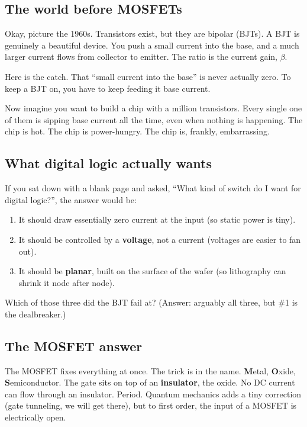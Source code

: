 \documentclass[11pt]{article}
\begin{document}
\subsection{The world before MOSFETs}

Okay, picture the 1960s. Transistors exist, but they are bipolar (BJTs). A BJT is genuinely a beautiful device. You push a small current into the base, and a much larger current flows from collector to emitter. The ratio is the current gain, $\beta$.

Here is the catch. That ``small current into the base'' is never actually zero. To keep a BJT on, you have to keep feeding it base current.

Now imagine you want to build a chip with a million transistors. Every single one of them is sipping base current all the time, even when nothing is happening. The chip is hot. The chip is power-hungry. The chip is, frankly, embarrassing.

\subsection{What digital logic actually wants}

If you sat down with a blank page and asked, ``What kind of switch do I want for digital logic?'', the answer would be:

\begin{enumerate}
\item It should draw essentially zero current at the input (so static power is tiny).
\item It should be controlled by a \textbf{voltage}, not a current (voltages are easier to fan out).
\item It should be \textbf{planar}, built on the surface of the wafer (so lithography can shrink it node after node).
\end{enumerate}

\begin{gut}
Which of those three did the BJT fail at? (Answer: arguably all three, but \#1 is the dealbreaker.)
\end{gut}

\subsection{The MOSFET answer}

The MOSFET fixes everything at once. The trick is in the name. \textbf{M}etal, \textbf{O}xide, \textbf{S}emiconductor. The gate sits on top of an \textbf{insulator}, the oxide. No DC current can flow through an insulator. Period. Quantum mechanics adds a tiny correction (gate tunneling, we will get there), but to first order, the input of a MOSFET is electrically open.
\end{document}
